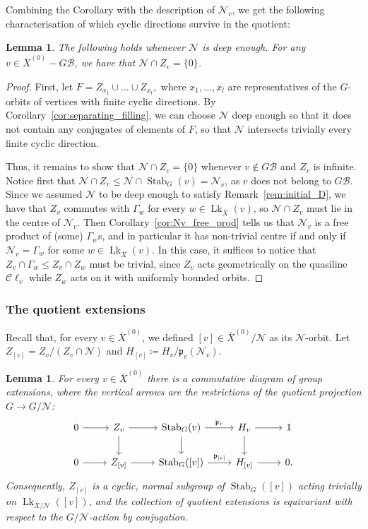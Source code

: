 \documentclass[svgnames]{amsart}
\theoremstyle{plain}
\newtheorem{lemma}[thm]{Lemma}
\theoremstyle{definition}
\newcommand{\C}{\mathcal C}
\newcommand{\ov}[1]{\overline{#1}}
\newcommand{\link}{\operatorname{Lk}}
\newcommand{\Stab}[2]{\operatorname{Stab}_{#1}(#2)}
\newcommand{\N}{\mathcal{N}}
\newcommand{\B}{\mathcal{B}}
\newcommand{\p}{\mathfrak{p}}
\begin{document}
Combining the Corollary with the description of $\N_v$, we get the following characterisation of which cyclic directions survive in the quotient:

\begin{lemma}\label{lem:NV_cap_Z_v} The following holds whenever $\N$ is deep enough. For any $v\in \ov{X}^{(0)}-G\B$, we have that $\N\cap Z_v=\{0\}$.
\end{lemma}

\begin{proof} 
First, let $F=Z_{x_1}\cup\ldots \cup Z_{x_l},$ where $x_1,\ldots,x_l$ are representatives of the $G$-orbits of vertices with finite cyclic directions. By Corollary~\ref{cor:separating_filling}, we can choose $\N$ deep enough so that it does not contain any conjugates of elements of $F$, so that $\N$ intersects trivially every finite cyclic direction.

Thus, it remains to show that $\N\cap Z_v=\{0\}$ whenever $v\not\in G\B$ and $Z_v$ is infinite. Notice first that $\N\cap Z_v\le \N\cap\Stab{G}{v}=\N_v$, as $v$ does not belong to $G\B$. Since we assumed $\N$ to be deep enough to satisfy Remark~\ref{rem:initial_D}, we have that $Z_v$ commutes with $\Gamma_w$ for every $w\in\link_{\ov X}(v)$, so $\N\cap Z_v$ must lie in the centre of $\N_v$. Then Corollary~\ref{cor:Nv_free_prod} tells us that $\N_v$ is a free product of (some) $\Gamma_w$s, and in particular it has non-trivial centre if and only if $\N_v=\Gamma_w$ for some $w\in\link_{\ov X}(v)$. In this case, it suffices to notice that $Z_v\cap\Gamma_w\le Z_v\cap Z_w$ must be trivial, since $Z_v$ acts geometrically on the quasiline $\C\ell_v$ while $Z_w$ acts on it with uniformly bounded orbits.
\end{proof}










\subsubsection{The quotient extensions}\label{subsec:quotient_ext}
Recall that, for every $v\in \ov{X}^{(0)}$, we defined $[v]\in \ov{X}^{(0)}/\N$ as its $\N$-orbit. Let $Z_{[v]}=Z_v/(Z_v\cap \N)$ and $H_{[v]}\coloneq H_v/\p_v(\N_v)$.
\begin{lemma}\label{lem:squid_for_quot_ext.1}
For every $v\in \ov{X}^{(0)}$ there is a commutative diagram of group extensions, where the vertical arrows are the restrictions of the quotient projection $G\to G/\N$:
$$\begin{tikzcd}
    0\ar{r}&Z_v\ar{r}\ar[d]&\Stab{G}{v}\ar{r}{\p_v}\ar{d}&H_v\ar{r}\ar{d}&1\\
    0\ar{r}&Z_{[v]}\ar{r}&\Stab{G}{[v]}\ar{r}{\p_{[v]}}&H_{[v]}\ar{r}&0.
\end{tikzcd}$$ 
Consequently, $Z_{[v]}$ is a cyclic, normal subgroup of $\Stab{G}{[v]}$ acting trivially on $\link_{\ov X/\N}([v])$, and the collection of quotient extensions is equivariant with respect to the $G/\N$-action by conjugation.
\end{lemma}
\end{document}
